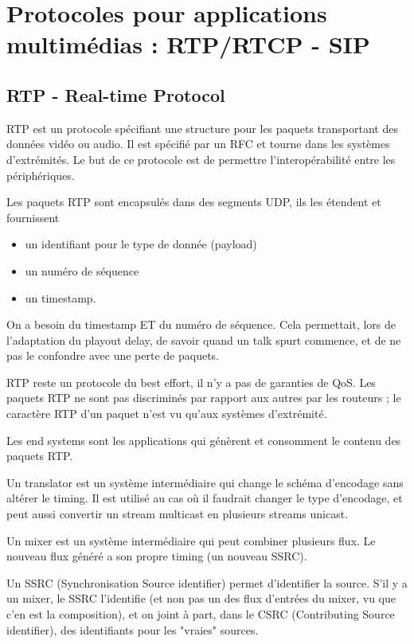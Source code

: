 \chapter{Protocoles pour applications multimédias : RTP/RTCP - SIP}

\section{RTP - Real-time Protocol}
		
		RTP est un protocole spécifiant une structure pour les paquets transportant des données vidéo ou audio. Il est spécifié par un RFC et tourne dans les systèmes d'extrémités. Le but de ce protocole est de permettre l'interopérabilité entre les périphériques.
		
		Les paquets RTP sont encapsulés dans des segments UDP, ils les étendent et fournissent
		
		\begin{itemize}
			\item un identifiant pour le type de donnée (payload)
			\item un numéro de séquence
			\item un timestamp.
		\end{itemize}
		
		On a besoin du timestamp ET du numéro de séquence. Cela permettait, lors de l'adaptation du playout delay, de savoir quand un talk spurt commence, et de ne pas le confondre avec une perte de paquets.
		
				
		RTP reste un protocole du best effort, il n'y a pas de garanties de QoS. Les paquets RTP ne sont pas discriminés par rapport aux autres par les routeurs ; le caractère RTP d'un paquet n'est vu qu'aux systèmes d'extrémité.
		
		
		Les end systems sont les applications qui génèrent et consomment le contenu des paquets RTP. 
				
		Un translator est un système intermédiaire qui change le schéma d'encodage sans altérer le timing. Il est utilisé au cas où il faudrait changer le type d'encodage, et peut aussi convertir un stream multicast en plusieurs streams unicast.
		
		Un mixer est un système intermédiaire qui peut combiner plusieurs flux. Le nouveau flux généré a son propre timing (un nouveau SSRC).
		
		Un SSRC (Synchronisation Source identifier) permet d'identifier la source. S'il y a un mixer, le SSRC l'identifie (et non pas un des flux d'entrées du mixer, vu que c'en est la composition), et on joint à part, dans le CSRC (Contributing Source identifier), des identifiants pour les "vraies" sources.
